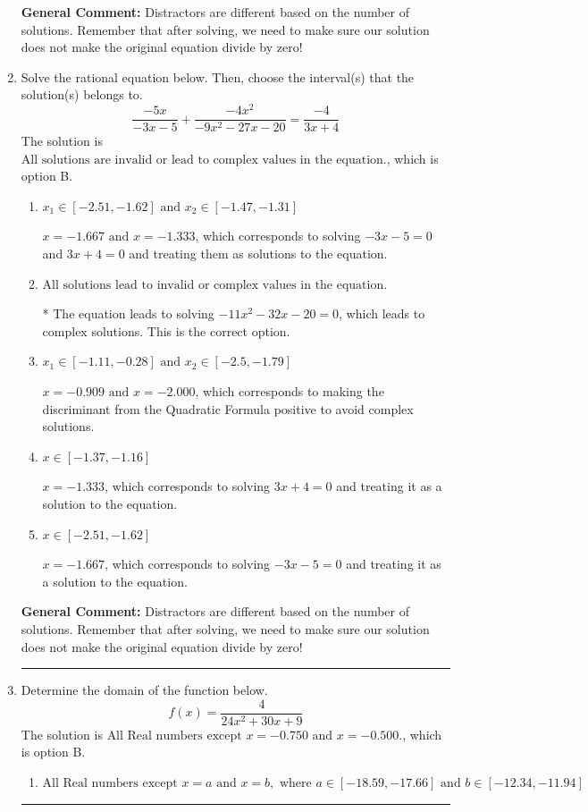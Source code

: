 \documentclass{extbook}[14pt]
\newcommand{\litem}[1]{\item #1

\rule{\textwidth}{0.4pt}}
\begin{document}
\begin{enumerate}
{\textbf{General Comment:} Distractors are different based on the number of solutions. Remember that after solving, we need to make sure our solution does not make the original equation divide by zero!
}
\litem{
Solve the rational equation below. Then, choose the interval(s) that the solution(s) belongs to.
\[ \frac{-5x}{-3x -5} + \frac{-4x^{2}}{-9x^{2} -27 x -20} = \frac{-4}{3x + 4} \]The solution is \( \text{All solutions are invalid or lead to complex values in the equation.} \), which is option B.\begin{enumerate}[label=\Alph*.]
\item \( x_1 \in [-2.51, -1.62] \text{ and } x_2 \in [-1.47,-1.31] \)

$x = -1.667 \text{ and } x = -1.333$, which corresponds to solving $-3x -5 = 0$ and $3x + 4 = 0$ and treating them as solutions to the equation.
\item \( \text{All solutions lead to invalid or complex values in the equation.} \)

* The equation leads to solving $-11x^{2} -32 x -20=0$, which leads to complex solutions. This is the correct option.
\item \( x_1 \in [-1.11, -0.28] \text{ and } x_2 \in [-2.5,-1.79] \)

$x = -0.909 \text{ and } x = -2.000$, which corresponds to making the discriminant from the Quadratic Formula positive to avoid complex solutions.
\item \( x \in [-1.37,-1.16] \)

$x = -1.333$, which corresponds to solving $3x + 4 = 0$ and treating it as a solution to the equation.
\item \( x \in [-2.51,-1.62] \)

$x = -1.667$, which corresponds to solving $-3x -5 = 0$ and treating it as a solution to the equation.
\end{enumerate}

\textbf{General Comment:} Distractors are different based on the number of solutions. Remember that after solving, we need to make sure our solution does not make the original equation divide by zero!
}
\litem{
Determine the domain of the function below.
\[ f(x) = \frac{4}{24x^{2} +30 x + 9} \]The solution is \( \text{All Real numbers except } x = -0.750 \text{ and } x = -0.500. \), which is option B.\begin{enumerate}[label=\Alph*.]
\item \( \text{All Real numbers except } x = a \text{ and } x = b, \text{ where } a \in [-18.59, -17.66] \text{ and } b \in [-12.34, -11.94] \)


\end{enumerate}}
\end{enumerate}
\end{document}
